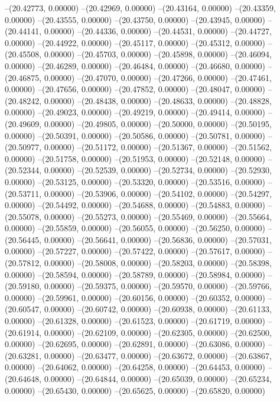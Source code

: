 --(20.42773, 0.00000)
--(20.42969, 0.00000)
--(20.43164, 0.00000)
--(20.43359, 0.00000)
--(20.43555, 0.00000)
--(20.43750, 0.00000)
--(20.43945, 0.00000)
--(20.44141, 0.00000)
--(20.44336, 0.00000)
--(20.44531, 0.00000)
--(20.44727, 0.00000)
--(20.44922, 0.00000)
--(20.45117, 0.00000)
--(20.45312, 0.00000)
--(20.45508, 0.00000)
--(20.45703, 0.00000)
--(20.45898, 0.00000)
--(20.46094, 0.00000)
--(20.46289, 0.00000)
--(20.46484, 0.00000)
--(20.46680, 0.00000)
--(20.46875, 0.00000)
--(20.47070, 0.00000)
--(20.47266, 0.00000)
--(20.47461, 0.00000)
--(20.47656, 0.00000)
--(20.47852, 0.00000)
--(20.48047, 0.00000)
--(20.48242, 0.00000)
--(20.48438, 0.00000)
--(20.48633, 0.00000)
--(20.48828, 0.00000)
--(20.49023, 0.00000)
--(20.49219, 0.00000)
--(20.49414, 0.00000)
--(20.49609, 0.00000)
--(20.49805, 0.00000)
--(20.50000, 0.00000)
--(20.50195, 0.00000)
--(20.50391, 0.00000)
--(20.50586, 0.00000)
--(20.50781, 0.00000)
--(20.50977, 0.00000)
--(20.51172, 0.00000)
--(20.51367, 0.00000)
--(20.51562, 0.00000)
--(20.51758, 0.00000)
--(20.51953, 0.00000)
--(20.52148, 0.00000)
--(20.52344, 0.00000)
--(20.52539, 0.00000)
--(20.52734, 0.00000)
--(20.52930, 0.00000)
--(20.53125, 0.00000)
--(20.53320, 0.00000)
--(20.53516, 0.00000)
--(20.53711, 0.00000)
--(20.53906, 0.00000)
--(20.54102, 0.00000)
--(20.54297, 0.00000)
--(20.54492, 0.00000)
--(20.54688, 0.00000)
--(20.54883, 0.00000)
--(20.55078, 0.00000)
--(20.55273, 0.00000)
--(20.55469, 0.00000)
--(20.55664, 0.00000)
--(20.55859, 0.00000)
--(20.56055, 0.00000)
--(20.56250, 0.00000)
--(20.56445, 0.00000)
--(20.56641, 0.00000)
--(20.56836, 0.00000)
--(20.57031, 0.00000)
--(20.57227, 0.00000)
--(20.57422, 0.00000)
--(20.57617, 0.00000)
--(20.57812, 0.00000)
--(20.58008, 0.00000)
--(20.58203, 0.00000)
--(20.58398, 0.00000)
--(20.58594, 0.00000)
--(20.58789, 0.00000)
--(20.58984, 0.00000)
--(20.59180, 0.00000)
--(20.59375, 0.00000)
--(20.59570, 0.00000)
--(20.59766, 0.00000)
--(20.59961, 0.00000)
--(20.60156, 0.00000)
--(20.60352, 0.00000)
--(20.60547, 0.00000)
--(20.60742, 0.00000)
--(20.60938, 0.00000)
--(20.61133, 0.00000)
--(20.61328, 0.00000)
--(20.61523, 0.00000)
--(20.61719, 0.00000)
--(20.61914, 0.00000)
--(20.62109, 0.00000)
--(20.62305, 0.00000)
--(20.62500, 0.00000)
--(20.62695, 0.00000)
--(20.62891, 0.00000)
--(20.63086, 0.00000)
--(20.63281, 0.00000)
--(20.63477, 0.00000)
--(20.63672, 0.00000)
--(20.63867, 0.00000)
--(20.64062, 0.00000)
--(20.64258, 0.00000)
--(20.64453, 0.00000)
--(20.64648, 0.00000)
--(20.64844, 0.00000)
--(20.65039, 0.00000)
--(20.65234, 0.00000)
--(20.65430, 0.00000)
--(20.65625, 0.00000)
--(20.65820, 0.00000)
